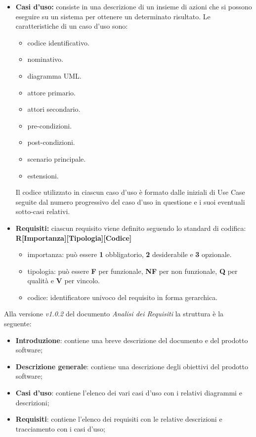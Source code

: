     \begin{itemize}
        \item \textbf{Casi d'uso:} consiste in una descrizione di un insieme di azioni che si possono eseguire su un sistema per ottenere un determinato risultato.
        Le caratteristiche di un caso d'uso sono:
        \begin{itemize}
            \item {codice identificativo.}
            \item {nominativo.}
            \item {diagramma UML.}
            \item {attore primario.}
            \item {attori secondario.}
            \item {pre-condizioni.}
            \item {post-condizioni.}
            \item {scenario principale.}
            \item {estensioni.}
        \end{itemize}
        Il codice utilizzato in ciascun caso d'uso è formato dalle iniziali di Use Case seguite dal numero progressivo del caso d'uso in questione e i suoi eventuali sotto-casi relativi.
        \item \textbf{Requisiti:} ciascun requisito viene definito seguendo lo standard di codifica:\\
        \textbf{R[Importanza][Tipologia][Codice]}
        \begin {itemize}
            \item{importanza:} può essere \textbf{1} obbligatorio, \textbf{2} desiderabile e \textbf{3} opzionale.
            \item {tipologia:} può essere \textbf{F} per funzionale, \textbf{NF} per non funzionale, \textbf{Q} per qualità e \textbf{V} per vincolo.
            \item {codice:} identificatore univoco del requisito in forma gerarchica.
        \end {itemize}
    \end{itemize}

    Alla versione \textit{v1.0.2} del documento \textit{Analisi dei Requisiti} la struttura è la seguente:
    \begin{itemize}
        \item \textbf{Introduzione}: contiene una breve descrizione del documento e del prodotto software;
        \item \textbf{Descrizione generale}: contiene una descrizione degli obiettivi del prodotto software;
        \item \textbf{Casi d'uso}: contiene l'elenco dei vari casi d'uso con i relativi diagrammi e descrizioni;
        \item \textbf{Requisiti}: contiene l'elenco dei requisiti con le relative descrizioni e tracciamento con i casi d'uso;
    \end{itemize}

